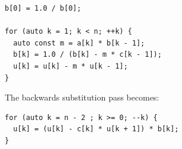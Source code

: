 \documentclass[conference]{IEEEtran}
\begin{document}
\begin{lstlisting}
b[0] = 1.0 / b[0];

for (auto k = 1; k < n; ++k) {
  auto const m = a[k] * b[k - 1];
  b[k] = 1.0 / (b[k] - m * c[k - 1]);
  u[k] = u[k] - m * u[k - 1];
} 
\end{lstlisting}

The backwards substitution pass becomes:

\begin{lstlisting}
for (auto k = n - 2 ; k >= 0; --k) {
  u[k] = (u[k] - c[k] * u[k + 1]) * b[k];
} 
\end{lstlisting}



%
%
%
%
%
%
%
%
\end{document}
